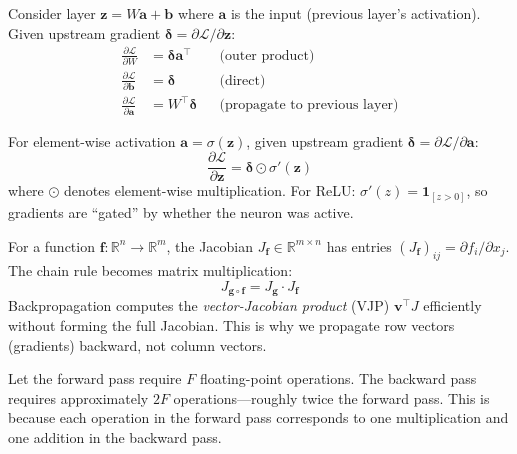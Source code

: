 \begin{example}
    Consider layer $\mathbf{z} = W\mathbf{a} + \mathbf{b}$ where $\mathbf{a}$ is the input (previous layer's activation). Given upstream gradient $\boldsymbol{\delta} = \partial\mathcal{L}/\partial\mathbf{z}$:
    \begin{align}
        \frac{\partial \mathcal{L}}{\partial W} &= \boldsymbol{\delta} \mathbf{a}^\top & &\text{(outer product)} \\[4pt]
        \frac{\partial \mathcal{L}}{\partial \mathbf{b}} &= \boldsymbol{\delta} & &\text{(direct)} \\[4pt]
        \frac{\partial \mathcal{L}}{\partial \mathbf{a}} &= W^\top \boldsymbol{\delta} & &\text{(propagate to previous layer)}
    \end{align}
\end{example}

\begin{example}
    For element-wise activation $\mathbf{a} = \sigma(\mathbf{z})$, given upstream gradient $\boldsymbol{\delta} = \partial\mathcal{L}/\partial\mathbf{a}$:
    \[
        \frac{\partial \mathcal{L}}{\partial \mathbf{z}} = \boldsymbol{\delta} \odot \sigma'(\mathbf{z})
    \]
    where $\odot$ denotes element-wise multiplication. For ReLU: $\sigma'(z) = \mathbf{1}_{[z > 0]}$, so gradients are ``gated'' by whether the neuron was active.
\end{example}

\begin{remark}
    For a function $\mathbf{f}: \mathbb{R}^n \to \mathbb{R}^m$, the Jacobian $J_\mathbf{f} \in \mathbb{R}^{m \times n}$ has entries $(J_\mathbf{f})_{ij} = \partial f_i/\partial x_j$. The chain rule becomes matrix multiplication:
    \[
        J_{\mathbf{g} \circ \mathbf{f}} = J_\mathbf{g} \cdot J_\mathbf{f}
    \]
    Backpropagation computes the \emph{vector-Jacobian product} (VJP) $\mathbf{v}^\top J$ efficiently without forming the full Jacobian. This is why we propagate row vectors (gradients) backward, not column vectors.
\end{remark}

\begin{proposition}
    Let the forward pass require $F$ floating-point operations. The backward pass requires approximately $2F$ operations---roughly twice the forward pass. This is because each operation in the forward pass corresponds to one multiplication and one addition in the backward pass.
\end{proposition}

